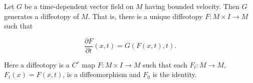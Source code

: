 Let $G$ be a time-dependent vector field on $M$ having bounded velocity. Then $G$ generates a diffeotopy of $M$. That is, there is a unique diffeotopy $F: M \times I \to M$ such that

$$\frac{\partial F}{\partial t}(x,t) = G(F(x,t),t).$$

Here a diffeotopy is a $C^r$ map $F: M \times I \to M$ such that each $F_t: M \to M$, $F_t(x) = F(x,t)$, is a diffeomorphism and $F_0$ is the identity.
